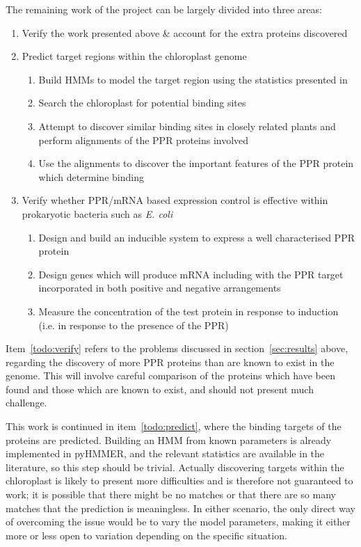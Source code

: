 \documentclass[twoside,a4paper]{article}
\begin{document}
\begin{multicols}{2}
The remaining work of the project can be largely divided into three areas:
\begin{enumerate}
  \item Verify the work presented above \& account for the extra proteins
    discovered \label{todo:verify}
  \item Predict target regions within the chloroplast genome
    \label{todo:predict}
    \begin{enumerate}
      \item Build HMMs to model the target region using the statistics
        presented in \cite{Barkan2012}
      \item Search the chloroplast for potential binding sites
      \item Attempt to discover similar binding sites in closely related plants
        and perform alignments of the PPR proteins involved
      \item Use the alignments to discover the important features of the PPR
        protein which determine binding
    \end{enumerate}
  \item Verify whether PPR/mRNA based expression control is effective within
    prokaryotic bacteria such as \textit{E. coli}
    \label{todo:wet}
    \begin{enumerate}
      \item Design and build an inducible system to express a well 
        characterised PPR protein
      \item Design genes which will produce mRNA including with the PPR target
        incorporated in both positive and negative arrangements
      \item Measure the concentration of the test protein in response to
        induction (i.e. in response to the presence of the PPR)
    \end{enumerate}
\end{enumerate}

Item~\ref{todo:verify} refers to the problems discussed in 
section~\ref{sec:results} above, regarding the discovery of more PPR proteins 
than are known to exist in the genome.
This will involve careful comparison of the proteins which have been found and
those which are known to exist, and should not present much challenge.

This work is continued in item~\ref{todo:predict}, where the binding targets of
the proteins are predicted.
Building an HMM from known parameters is already implemented in pyHMMER, and
the relevant statistics are available in the literature\cite{Barkan2012}, so
this step should be trivial.
Actually discovering targets within the chloroplast is likely to present more
difficulties and is therefore not guaranteed to work; it is possible
that there might be no matches or that there are so many matches that the
prediction is meaningless.
In either scenario, the only direct way of overcoming the issue would be to
vary the model parameters, making it either more or less open to variation
depending on the specific situation.


\end{multicols}
\end{document}
